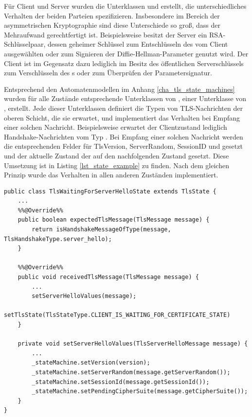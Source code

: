 Für Client und Server wurden die Unterklassen  und  erstellt, die unterschiedliches Verhalten der beiden Parteien spezifizieren. Insbesondere im Bereich der asymmetrischen Kryptographie sind diese Unterschiede so groß, dass der Mehraufwand gerechtfertigt ist. Beispielsweise besitzt der Server ein RSA-Schlüsselpaar, dessen geheimer Schlüssel zum Entschlüsseln des vom Client ausgewählten \premastersecret{} oder zum Signieren der Diffie-Hellman-Parameter genutzt wird. Der Client ist im Gegensatz dazu lediglich im Besitz des öffentlichen Serverschlüssels zum Verschlüsseln des \premastersecret{}s oder zum Überprüfen der Parametersignatur.

Entsprechend den Automatenmodellen im Anhang \ref{cha_tls_state_machines} wurden für alle Zustände entsprechende Unterklassen von , einer Unterklasse von , erstellt. Jede dieser Unterklassen definiert die Typen von TLS-Nachrichten der oberen Schicht, die sie erwartet, und implementiert das Verhalten bei Empfang einer solchen Nachricht. Beispielsweise erwartet der Clientzustand  lediglich Handshake-Nachrichten vom Typ \serverhello{}. Bei Empfang einer solchen Nachricht werden die entsprechenden Felder für TlsVersion, ServerRandom, SessionID und \ciphersuite{} gesetzt und der aktuelle Zustand der  auf den nachfolgenden Zustand gesetzt. Diese Umsetzung ist in Listing \ref{lst_state_example} zu finden. Nach dem gleichen Prinzip wurde das Verhalten in allen anderen Zuständen implementiert. 

\begin{lstlisting}
public class TlsWaitingForServerHelloState extends TlsState {
	...
	%%@Override%%
	public boolean expectedTlsMessage(TlsMessage message) {
		return isHandshakeMessageOfType(message, TlsHandshakeType.server_hello);
	}

	%%@Override%%
	public void receivedTlsMessage(TlsMessage message) {
		...
		setServerHelloValues(message);
		setTlsState(TlsStateType.CLIENT_IS_WAITING_FOR_CERTIFICATE_STATE)
	}

	private void setServerHelloValues(TlsServerHelloMessage message) {
		...
		_stateMachine.setVersion(version);
		_stateMachine.setServerRandom(message.getServerRandom());
		_stateMachine.setSessionId(message.getSessionId());
		_stateMachine.setPendingCipherSuite(message.getCipherSuite());
	}
}
\end{lstlisting}

